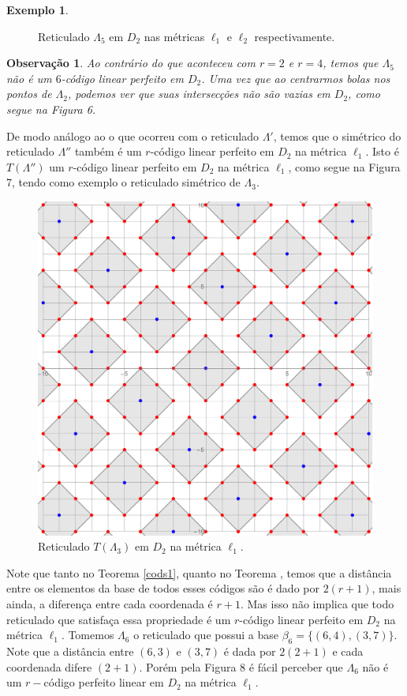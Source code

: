 \documentclass{article}
\theoremstyle{plain}
\newtheorem{observation}{Observa\c{c}\~ao}
\theoremstyle{definition}
\newtheorem{example}{Exemplo}
\theoremstyle{remark}
\begin{document}
\begin{example}
\begin{figure}[ht]
    \caption{Reticulado $\Lambda_5$ em $D_2$ nas métricas $\ell_1$ e $\ell_2$ respectivamente.}
  \end{figure}
\end{example}

\begin{observation}
  Ao contrário do que aconteceu com $r=2$ e $r=4$, temos que $\Lambda_5$ não é um $6$-código linear perfeito em $D_2$. Uma vez que ao centrarmos bolas nos pontos de $\Lambda_2$, podemos ver que suas intersecções não são vazias em $D_2$, como segue na Figura 6.
  \vspace{0.5cm}
\end{observation}

De modo análogo ao o que ocorreu com o reticulado $\Lambda'$, temos que o simétrico do reticulado $\Lambda''$ também é um $r$-código linear perfeito em $D_2$ na métrica $\ell_1$. Isto é $T(\Lambda'')$  um $r$-código linear perfeito em $D_2$ na métrica $\ell_1$, como segue na Figura 7, tendo como exemplo o reticulado simétrico de $\Lambda_3$.

\begin{figure}[ht]
  \centering
  \includegraphics[scale=0.23]{simr2l2.pdf}
  \caption{Reticulado $T(\Lambda_3)$ em $D_2$ na métrica $\ell_1$.}
\end{figure}

Note que tanto no Teorema \ref{cods1}, quanto no Teorema , temos que a distância entre os elementos da base de todos esses códigos são é dado por $2(r+1)$, mais ainda, a diferença entre cada coordenada é $r+1$. Mas isso não implica que todo reticulado que satisfaça essa propriedade é um $r$-código linear perfeito em $D_2$ na métrica $\ell_1$. Tomemos $\Lambda_6$ o reticulado que possui a base $\beta_6 = \{(6,4),(3,7)\}$. Note que a distância entre $(6,3)$ e $(3,7)$ é dada por $2(2+1)$ e cada coordenada difere $(2+1)$. Porém pela Figura 8 é fácil perceber que $\Lambda_6$ não é um $r-$código perfeito linear em $D_2$ na métrica $\ell_1$.
\end{document}
